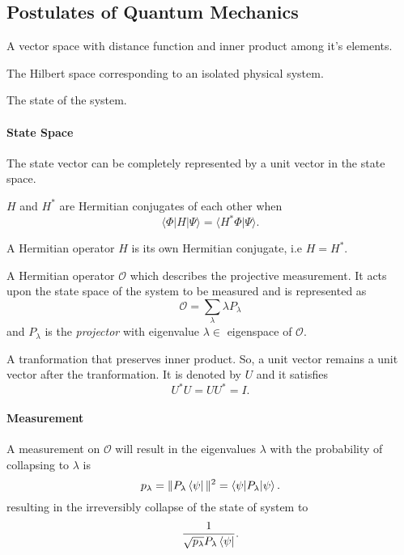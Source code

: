 \subsection{Postulates of Quantum Mechanics}
\begin{definition}
A vector space with distance function and inner product among it's elements.
\end{definition}
\begin{definition}
The Hilbert space corresponding to an isolated physical system.
\end{definition}
\begin{definition}
The state of the system.
\end{definition}
\paragraph{\textbf{State} \textbf{Space}} The state vector can be completely represented by a unit vector in the state space.
\begin{definition}
$H$ and $H^*$ are Hermitian conjugates of each other when 
\[\langle \Phi | H | \Psi \rangle  = \langle H^* \Phi | \Psi \rangle.\]
\end{definition}
\begin{definition}
A Hermitian operator $H$ is its own Hermitian conjugate, i.e $H = H^*$.
\end{definition}
\begin{definition}[Observable]
A Hermitian operator $\mathcal{O}$ which describes the projective measurement. It acts upon the state space of the system to be measured and is represented as 
\[\mathcal{O} = \sum_{\lambda}\lambda P_\lambda\]
and $P_\lambda$ is the \emph{projector} with eigenvalue $\lambda \in$ eigenspace of $\mathcal{O}$.
\end{definition}
\begin{definition}
A tranformation that preserves inner product. So, a unit vector remains a unit vector after the tranformation. It is denoted by $U$ and it satisfies
\[U^*U = UU^* = I.\]
\end{definition}
\paragraph{\textbf{Measurement}}
A measurement on $\mathcal{O}$ will result in the eigenvalues $\lambda$ with the probability of collapsing to $\lambda$ is \[p_\lambda = \|P_\lambda\bra{\psi}\|^2 = \braket{\psi|P_\lambda|\psi}.\]
resulting in the irreversibly collapse of the state of system to
\[\frac{1}{\sqrt{p_\lambda}P_\lambda\bra{\psi}}.\]
